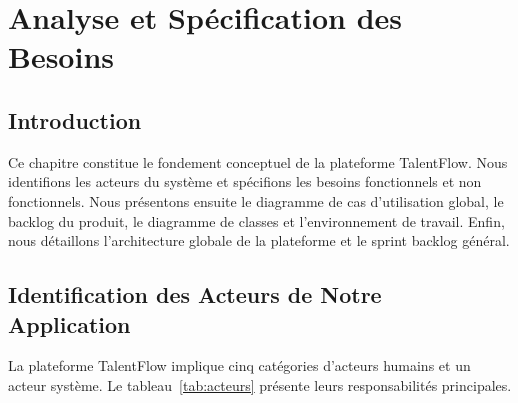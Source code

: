 \chapter{Analyse et Spécification des Besoins}

\section*{Introduction}

Ce chapitre constitue le fondement conceptuel de la plateforme TalentFlow. Nous
identifions les acteurs du système et spécifions les besoins fonctionnels et non
fonctionnels. Nous présentons ensuite le diagramme de cas d'utilisation global, le
backlog du produit, le diagramme de classes et l'environnement de travail. Enfin,
nous détaillons l'architecture globale de la plateforme et le sprint backlog général.

\section{Identification des Acteurs de Notre Application}

La plateforme TalentFlow implique cinq catégories d'acteurs humains et un acteur système.
Le tableau~\ref{tab:acteurs} présente leurs responsabilités principales.

